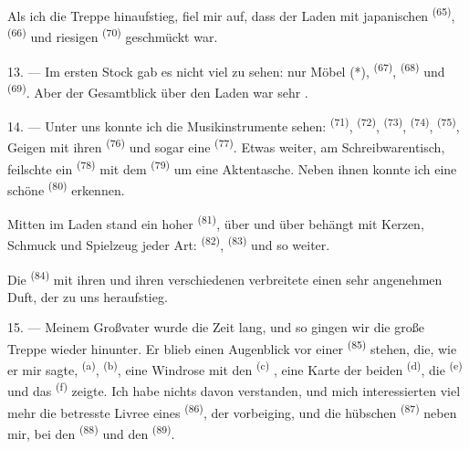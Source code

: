 Als ich die Treppe hinaufstieg, fiel mir auf, dass der Laden mit japanischen
 \textsuperscript{(65)}, 
\textsuperscript{(66)} und riesigen  \textsuperscript{(70)} geschmückt
war.

13. --- Im ersten Stock gab es nicht viel zu sehen: nur Möbel (*),
 \textsuperscript{(67)}, 
\textsuperscript{(68)} und  \textsuperscript{(69)}. Aber der
Gesamtblick über den Laden war sehr .

14. --- Unter uns konnte ich die Musikinstrumente sehen: 
\textsuperscript{(71)},  \textsuperscript{(72)},
 \textsuperscript{(73)}, 
\textsuperscript{(74)},  \textsuperscript{(75)}, Geigen mit
ihren  \textsuperscript{(76)} und sogar eine 
\textsuperscript{(77)}. Etwas weiter, am Schreibwarentisch, feilschte ein
 \textsuperscript{(78)} mit dem 
\textsuperscript{(79)} um eine Aktentasche. Neben ihnen konnte ich eine schöne
 \textsuperscript{(80)} erkennen.

Mitten im Laden stand ein hoher  \textsuperscript{(81)}, über
und über behängt mit Kerzen, Schmuck und Spielzeug jeder Art:
 \textsuperscript{(82)}, 
\textsuperscript{(83)} und so weiter.

Die  \textsuperscript{(84)} mit ihren  und
ihren verschiedenen  verbreitete einen sehr angenehmen Duft, der zu
uns heraufstieg.

\VUsaut{3.4mm}
\VUsaut{2.8mm}

15. --- Meinem Großvater wurde die Zeit lang, und so gingen wir die große Treppe
wieder hinunter. Er blieb einen Augenblick vor einer 
\textsuperscript{(85)} stehen, die, wie er mir sagte, 
\textsuperscript{(a)},  \textsuperscript{(b)},
eine Windrose mit den  \textsuperscript{(c)}
, eine Karte der beiden
 \textsuperscript{(d)}, die 
\textsuperscript{(e)} und das  \textsuperscript{(f)} zeigte. Ich
habe nichts davon verstanden, und mich interessierten viel mehr die betresste Livree
eines  \textsuperscript{(86)}, der vorbeiging, und die hübschen
 \textsuperscript{(87)} neben mir, bei den 
\textsuperscript{(88)} und den  \textsuperscript{(89)}.

